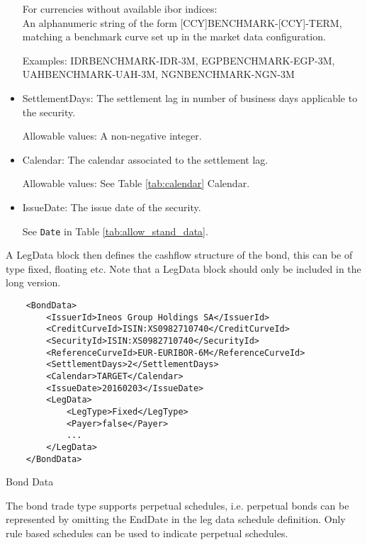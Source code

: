 \begin{itemize}
For currencies without available ibor indices:  \\
An alphanumeric string of the form [CCY]BENCHMARK-[CCY]-TERM, matching a benchmark curve set up in the market data configuration.

Examples: IDRBENCHMARK-IDR-3M, EGPBENCHMARK-EGP-3M, UAHBENCHMARK-UAH-3M, NGNBENCHMARK-NGN-3M
 
\item SettlementDays: The settlement lag in number of business days applicable to the security.

Allowable values: A non-negative integer.

\item Calendar: The calendar associated to the settlement lag.

Allowable values: See Table \ref{tab:calendar} Calendar.

\item IssueDate: The issue date of the security.

See \lstinline!Date! in Table \ref{tab:allow_stand_data}.

\end{itemize}

A LegData block then defines the cashflow structure of the bond, this can be of type fixed, floating etc. Note that a LegData block should only be included in the long version. 

\begin{listing}[H]
\begin{verbatim}
    <BondData>
        <IssuerId>Ineos Group Holdings SA</IssuerId>
        <CreditCurveId>ISIN:XS0982710740</CreditCurveId>
        <SecurityId>ISIN:XS0982710740</SecurityId>
        <ReferenceCurveId>EUR-EURIBOR-6M</ReferenceCurveId>
        <SettlementDays>2</SettlementDays>
        <Calendar>TARGET</Calendar>
        <IssueDate>20160203</IssueDate>
        <LegData>
            <LegType>Fixed</LegType>
            <Payer>false</Payer>
            ...
        </LegData>
    </BondData>
\end{verbatim}
\caption{Bond Data}
\label{lst:bonddata}
\end{listing}

The bond trade type supports perpetual schedules, i.e. perpetual bonds can be represented by omitting the EndDate in the
leg data schedule definition. Only rule based schedules can be used to indicate perpetual schedules.

